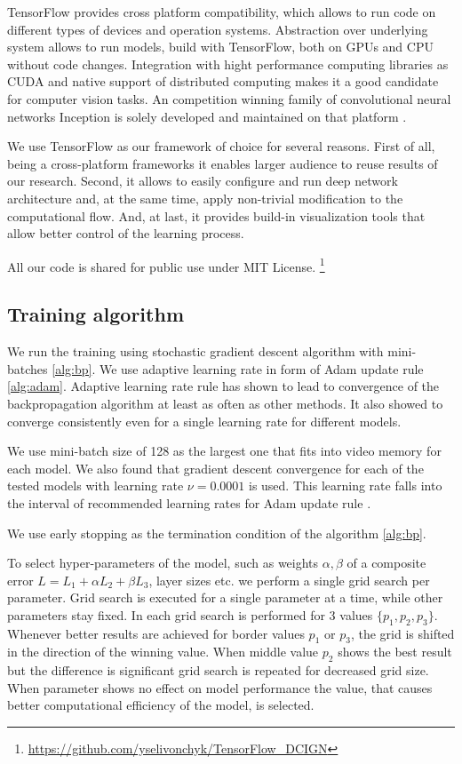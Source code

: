 TensorFlow provides cross platform compatibility, which allows to run code on different types of devices and operation systems.
Abstraction over underlying system allows to run models, build with TensorFlow, both on GPUs and CPU without code changes.
Integration with hight performance computing libraries as CUDA \cite{Nickolls2008} and native support of distributed computing makes it a good candidate for computer vision tasks.
An competition winning family of convolutional neural networks Inception is solely developed and maintained on that platform \cite{Szegedy2016}.

We use TensorFlow as our framework of choice for several reasons.
First of all, being a cross-platform frameworks it enables larger audience to reuse results of our research.
Second, it allows to easily configure and run deep network architecture and, at the same time, apply non-trivial modification to the computational flow.
And, at last, it provides build-in visualization tools that allow better control of the learning process.

All our code is shared for public use under MIT License.
\footnote{\url{https://github.com/yselivonchyk/TensorFlow_DCIGN}}

\subsection{Training algorithm}

We run the training using stochastic gradient descent algorithm with mini-batches \ref{alg:bp}. We use adaptive learning rate in form of Adam update rule \ref{alg:adam}. Adaptive learning rate rule has shown to lead to convergence of the backpropagation algorithm at least as often as other methods. It also showed to converge consistently even for a single learning rate for different models.

We use mini-batch size of 128 as the largest one that fits into video memory for each model.
We also found that gradient descent convergence for each of the tested models with learning rate $\nu=0.0001$ is used. This learning rate falls into the interval of recommended learning rates for Adam update rule \cite{Kingma2015}.

We use early stopping as the termination condition of the algorithm \ref{alg:bp}.

To select hyper-parameters of the model, such as weights $\alpha, \beta$ of a composite error $L=L_1 + \alpha L_2 + \beta L_3$, layer sizes etc. we perform a single grid search per parameter.
Grid search is executed for a single parameter at a time, while other parameters stay fixed.
In each grid search is performed for 3 values $\{p_1, p_2, p_3\}$. Whenever better results are achieved for border values $p_1$ or $p_3$, the grid is shifted in the direction of the winning value. When middle value $p_2$ shows the best result but the difference is significant grid search is repeated for decreased grid size.
When parameter shows no effect on model performance the value, that causes better computational efficiency of the model, is selected.

